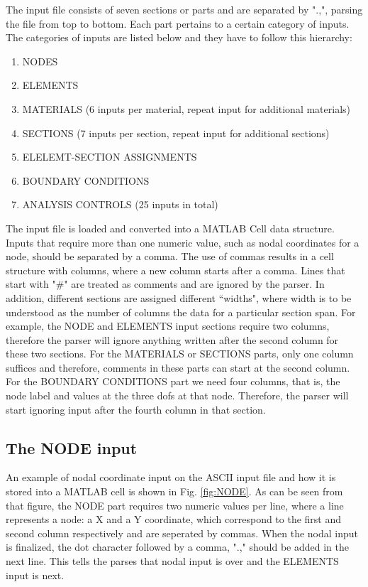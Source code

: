 \begin{appendices}
The input file consists of seven sections or parts and are separated by ".,", 
parsing the file from top to bottom. Each part pertains to a certain category 
of inputs. The categories of inputs are listed below and they have to follow 
this hierarchy:

\begin{enumerate}
	\item NODES
	\item ELEMENTS
	\item MATERIALS (6 inputs per material, repeat input for additional 
	materials)
	\item SECTIONS (7 inputs per section, repeat input for additional sections)
	\item ELELEMT-SECTION ASSIGNMENTS
	\item BOUNDARY CONDITIONS
	\item ANALYSIS CONTROLS (25 inputs in total)
\end{enumerate}

The input file is loaded and converted into a MATLAB Cell data structure. 
Inputs that require more than one numeric value, such as nodal coordinates for 
a node, should be separated by a comma. The use of commas results in a cell 
structure with columns, where a new column starts after a comma. Lines that 
start with "$\#$" are treated as comments and are 
ignored by the parser. In addition, different sections are assigned different 
``widths", where width is to be understood as the number of columns the data 
for a particular section span. For example, the NODE and ELEMENTS input 
sections require two columns, therefore the parser will ignore anything written 
after the second column for these two sections. For the MATERIALS or SECTIONS 
parts, only one column suffices and therefore, comments in these parts can 
start at the second column. For the BOUNDARY CONDITIONS part we need four 
columns, that is, the node label and values at the three \acrshort{dof}s at 
that node. Therefore, the parser will start ignoring input after the fourth 
column in that section. 

\subsection*{The NODE input}

An example of nodal coordinate input on the ASCII input file and how it is 
stored into a MATLAB cell is shown in Fig. \ref{fig:NODE}. As can be seen from 
that figure, the NODE part requires two numeric values per line, where a line 
represents a node: a X and a Y coordinate, which correspond to the first and 
second column respectively and are seperated by commas. When the nodal input is 
finalized, the dot character followed by a comma, ".," should be added in the 
next line. This tells the parses that nodal input is over and the ELEMENTS 
input is next.



\end{appendices}
